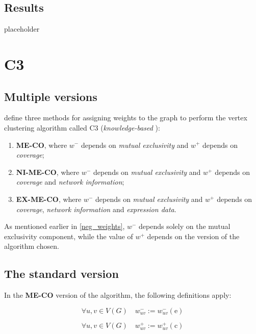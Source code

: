 \subsection{Results}

placeholder 

\section{C3}

\subsection{Multiple versions}

\textcite{c3} define three methods for assigning weights to the graph to perform the vertex clustering algorithm called C3 (\textit{knowledge-based} \cite{survey}):

\begin{enumerate}
    \item \textbf{ME-CO}, where $w^-$ depends on \textit{mutual exclusivity} and $w^+$ depends on \textit{coverage};
    \item \textbf{NI-ME-CO}, where $w^-$ depends on \textit{mutual exclusivity} and $w^+$ depends on \textit{coverage} and \textit{network information};
    \item \textbf{EX-ME-CO}, where $w^-$ depends on \textit{mutual exclusivity} and $w^+$ depends on \textit{coverage}, \textit{network information} and \textit{expression data}.
\end{enumerate}

As mentioned earlier in \cref{neg_weights}, $w^-$ depends solely on the mutual exclusivity component, while the value of $w^+$ depends on the version of the algorithm chosen.

\subsection{The standard version}

\begin{definition}[ME-CO]
    In the \textbf{ME-CO} version of the algorithm, the following definitions apply:

    \begin{equation}
        \forall u, v \in V(G) \quad w_{uv}^- := w^-_{uv}(\mathrm e)
    \end{equation}

    \begin{equation}
        \forall u, v \in V(G) \quad w_{uv}^+ := w^+_{uv}(\mathrm c)
    \end{equation}
\end{definition}

